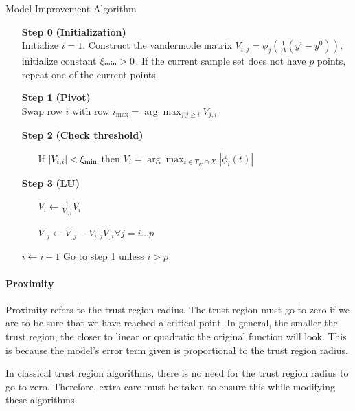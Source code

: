 \begin{algorithm}[H]
    \caption{Model Improvement Algorithm}
    \label{model_improving_algorithm}
    \begin{itemize}
        \item[\textbf{Step 0}] \textbf{(Initialization)} \\
            Initialize $i=1$.
            Construct the vandermode matrix $V_{i,j} = \phi_j(\frac 1 {\Delta}(y^i - y^0))$, initialize constant $\xi_{\text{min}} > 0$.
            If the current sample set does not have $p$ points, repeat one of the current points. 
            
        \item[\textbf{Step 1}] \textbf{(Pivot)} \\
            Swap row $i$ with row $i_{\max} = \arg \max_{j|j\ge i} V_{j,i} $
        
        \item[\textbf{Step 2}] \textbf{(Check threshold)} \begin{itemize}
                \item[] If $|V_{i,i}| < \xi_{\text{min}}$ then \label{next_point} $V_{i} = \arg\max_{t \in T_K \cap X} |\phi_i(t)|$
            \end{itemize}
        
        \item[\textbf{Step 3}] \textbf{(LU)} \begin{itemize}
                \item[] $V_i \gets \frac{1}{V_{i,i}} V_i$
                \item[] $V_{,j} \gets V_{, j} - V_{i,j} V_{, i} \forall j=i \ldots p$
            \end{itemize}
            $i \gets i+1$
            Go to step 1 unless $i > p$
    \end{itemize}
\end{algorithm}

\paragraph{Proximity}

Proximity refers to the trust region radius.
The trust region must go to zero if we are to be sure that we have reached a critical point.
In general, the smaller the trust region, the closer to linear or quadratic the original function will look.
This is because the model's error term given is proportional to the trust region radius.

In classical trust region algorithms, there is no need for the trust region radius to go to zero.
Therefore, extra care must be taken to ensure this while modifying these algorithms.

